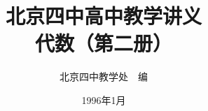 \documentclass[b5paper, openany]{ctexbook}
\theoremstyle{plain}
\begin{document}
\title{\Huge\bfseries 北京四中高中教学讲义\\代数（第二册）}



\author{\Large 北京四中教学处~~编}
\date{\Large 1996年1月}

\maketitle




\frontmatter


\tableofcontents


\mainmatter

\setcounter{chapter}{3}  



 
 









\backmatter
\end{document}
